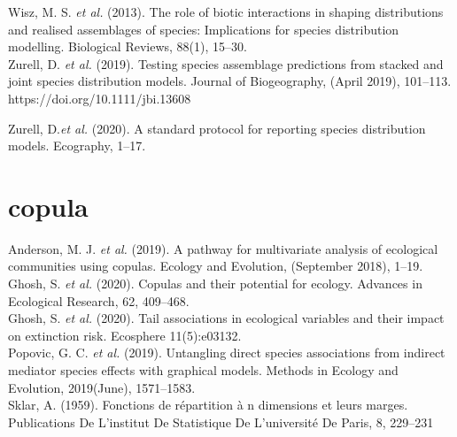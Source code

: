 \documentclass{article}
\begin{document}
Wisz, M. S. \textit{et al.} (2013). The role of biotic interactions in shaping distributions and realised assemblages of species: Implications for species distribution modelling. Biological Reviews, 88(1), 15–30.\\

Zurell, D. \textit{et al.} (2019). Testing species assemblage predictions from stacked and joint species distribution models. Journal of Biogeography, (April 2019), 101–113. https://doi.org/10.1111/jbi.13608

Zurell, D.\textit{et al.} (2020). A standard protocol for reporting species distribution models. Ecography, 1–17.\\

\section{copula}

Anderson, M. J. \textit{et al.} (2019). A pathway for multivariate analysis of ecological communities using copulas. Ecology and Evolution, (September 2018), 1–19.\\

Ghosh, S. \textit{et al.} (2020). Copulas and their potential for ecology. Advances in Ecological Research, 62, 409–468. \\

Ghosh, S. \textit{et al.} (2020). Tail associations in ecological variables and their impact on extinction risk. Ecosphere 11(5):e03132. \\

Popovic, G. C. \textit{et al.} (2019). Untangling direct species associations from indirect mediator species effects with graphical models. Methods in Ecology and Evolution, 2019(June), 1571–1583. \\

Sklar, A. (1959). Fonctions de répartition à n dimensions et leurs marges. Publications De L’institut De Statistique De L’université De Paris, 8, 229–231\\ 

\
\end{document}
